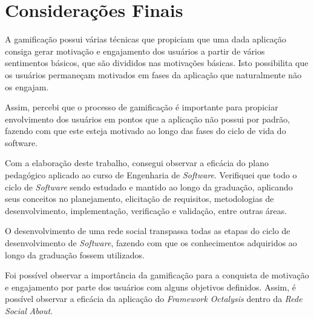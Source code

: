 \chapter[Considerações Finais]{Considerações Finais}
A gamificação possui várias técnicas que propiciam que uma dada aplicação
consiga gerar motivação e engajamento dos usuários a partir de vários sentimentos
básicos, que são divididos nas motivações básicas. Isto possibilita que os
usuários permaneçam motivados em fases da aplicação que naturalmente não os
engajam.

Assim, percebi que o processo de gamificação é importante para propiciar
envolvimento dos usuários em pontos que a aplicação não possui por padrão,
fazendo com que este esteja motivado ao longo das fases do
ciclo de vida do software.


Com a elaboração deste trabalho, consegui observar
a eficácia do plano pedagógico aplicado ao curso de Engenharia de \textit{Software}.
Verifiquei que todo o ciclo de \textit{Software}
sendo estudado e mantido ao longo da graduação, aplicando seus conceitos
no planejamento, elicitação de requisitos, metodologias de desenvolvimento,
implementação, verificação e validação, entre outras áreas.

O desenvolvimento de uma rede social transpassa todas as etapas do
ciclo de desenvolvimento de \textit{Software}, fazendo com que os conhecimentos
adquiridos ao longo da graduação fossem utilizados.

Foi possível observar a importância da gamificação para a conquista
de motivação e engajamento por parte dos usuários com alguns objetivos
definidos. Assim, é possível observar a eficácia da aplicação do \textit{Framework}
\textit{Octalysis} dentro da \textit{Rede} \textit{Social} \textit{About}.
